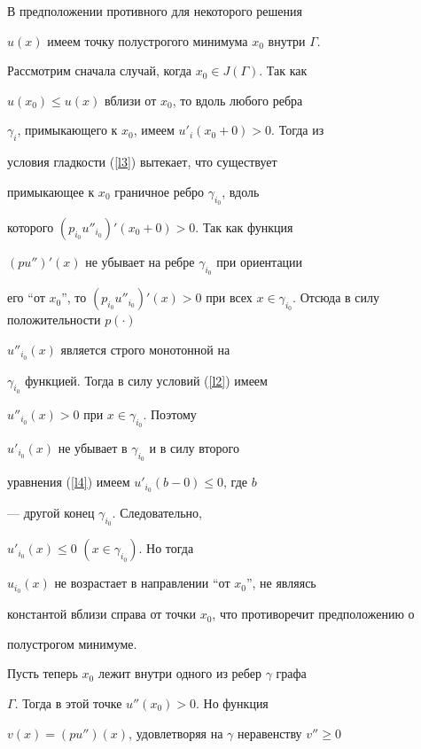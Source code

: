 {{{{{{{\begin{lem}
\end{lem}





\begin{pf} В предположении противного для некоторого решения


$u(x)$ имеем точку полустрогого минимума $x_0$ внутри $\Gamma$.


Рассмотрим сначала случай, когда $x_0 \in J(\Gamma)$. Так как


$u(x_0)\leq u(x)$ вблизи от $x_0$, то вдоль любого ребра


$\gamma_i$, примыкающего к $x_0$, имеем $u'_{i}(x_0+0)>0$. Тогда из


условия гладкости (\ref{l3}) вытекает, что существует


примыкающее к $x_0$ граничное ребро $\gamma_{i_0}$, вдоль


которого $(p_{i_0}u''_{i_0})'(x_0+0)>0$. Так как функция


$(pu'')'(x)$ не убывает на ребре $\gamma_{i_0}$ при ориентации


его ``от $x_0$'', то $(p_{i_0}u''_{i_0})'(x)>0$ при всех $x \in


\gamma_{i_0}$. Отсюда в силу положительности $p(\cdot)$\;


$u''_{i_0}(x)$ является строго монотонной на


$\gamma_{i_0}$ функцией. Тогда в силу условий (\ref{l2}) имеем


$u''_{i_0}(x) > 0$ при $x \in \gamma_{i_0}$. Поэтому


$u'_{i_0}(x) $ не убывает в $\gamma_{i_0}$ и в силу второго


уравнения (\ref{l4}) имеем $u'_{i_0}(b-0)\leq 0 $, где $b$


--- другой конец $\gamma_{i_0}$. Следовательно,


$u'_{i_0}(x)\leq 0$ $(x \in \gamma_{i_0})$. Но тогда


$u_{i_0}(x)$ не возрастает в направлении ``от $x_0$'', не являясь


константой вблизи справа от точки $x_0$, что противоречит предположению о 


полустрогом минимуме.





Пусть теперь $x_0$ лежит внутри одного из ребер $\gamma$ графа


$\Gamma$. Тогда в этой точке $u''(x_0)>0$. Но функция


$v(x)=(pu'')(x)$, удовлетворяя на $\gamma$ неравенству $v''\geq 0$



\end{pf}}}}}}}}
